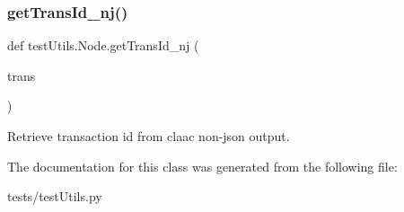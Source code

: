 \subsubsection{\texorpdfstring{get\+Trans\+Id\+\_\+nj()}{getTransId\_nj()}}
{\footnotesize\ttfamily def test\+Utils.\+Node.\+get\+Trans\+Id\+\_\+nj (\begin{DoxyParamCaption}\item[{}]{trans }\end{DoxyParamCaption})\hspace{0.3cm}{\ttfamily [static]}}

\begin{DoxyVerb}Retrieve transaction id from claac non-json output.\end{DoxyVerb}
 

The documentation for this class was generated from the following file\+:\begin{DoxyCompactItemize}
\item 
tests/test\+Utils.\+py\end{DoxyCompactItemize}
